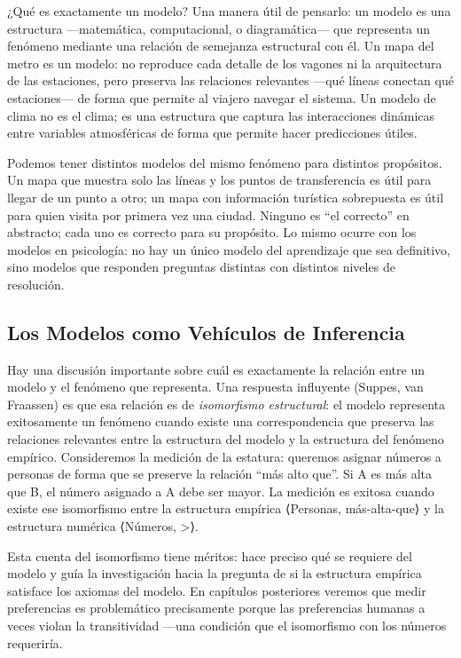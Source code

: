 \documentclass[
  letterpaper,
  DIV=11,
  numbers=noendperiod]{scrreprt}
\begin{document}
¿Qué es exactamente un modelo? Una manera útil de pensarlo: un modelo es
una estructura ---matemática, computacional, o diagramática--- que
representa un fenómeno mediante una relación de semejanza estructural
con él. Un mapa del metro es un modelo: no reproduce cada detalle de los
vagones ni la arquitectura de las estaciones, pero preserva las
relaciones relevantes ---qué líneas conectan qué estaciones--- de forma
que permite al viajero navegar el sistema. Un modelo de clima no es el
clima; es una estructura que captura las interacciones dinámicas entre
variables atmosféricas de forma que permite hacer predicciones útiles.

Podemos tener distintos modelos del mismo fenómeno para distintos
propósitos. Un mapa que muestra solo las líneas y los puntos de
transferencia es útil para llegar de un punto a otro; un mapa con
información turística sobrepuesta es útil para quien visita por primera
vez una ciudad. Ninguno es ``el correcto'' en abstracto; cada uno es
correcto para su propósito. Lo mismo ocurre con los modelos en
psicología: no hay un único modelo del aprendizaje que sea definitivo,
sino modelos que responden preguntas distintas con distintos niveles de
resolución.

\subsection{Los Modelos como Vehículos de
Inferencia}\label{los-modelos-como-vehuxedculos-de-inferencia}

Hay una discusión importante sobre cuál es exactamente la relación entre
un modelo y el fenómeno que representa. Una respuesta influyente
(Suppes, van Fraassen) es que esa relación es de \emph{isomorfismo
estructural}: el modelo representa exitosamente un fenómeno cuando
existe una correspondencia que preserva las relaciones relevantes entre
la estructura del modelo y la estructura del fenómeno empírico.
Consideremos la medición de la estatura: queremos asignar números a
personas de forma que se preserve la relación ``más alto que''. Si A es
más alta que B, el número asignado a A debe ser mayor. La medición es
exitosa cuando existe ese isomorfismo entre la estructura empírica
⟨Personas, más-alta-que⟩ y la estructura numérica ⟨Números,
\textgreater⟩.

Esta cuenta del isomorfismo tiene méritos: hace preciso qué se requiere
del modelo y guía la investigación hacia la pregunta de si la estructura
empírica satisface los axiomas del modelo. En capítulos posteriores
veremos que medir preferencias es problemático precisamente porque las
preferencias humanas a veces violan la transitividad ---una condición
que el isomorfismo con los números requeriría.
\end{document}
